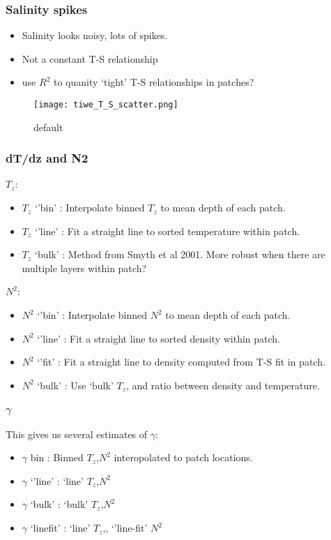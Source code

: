 \documentclass{beamer}
\begin{document}
\begin{frame}
 \frametitle{Salinity spikes}
\begin{itemize}
\item Salinity looks noisy, lots of spikes.
\item Not a constant T-S relationship 
\item use $R^2$ to quanity `tight' T-S relationships in patches?
\end{itemize}


\begin{figure}[htbp]
\begin{center}
\texttt{[image: tiwe\_T\_S\_scatter.png]}
\caption{default}
\label{default}
\end{center}
\end{figure}


\end{frame}




\begin{frame}
 \frametitle{dT/dz and N2}
 
$T_z$:
\begin{itemize}
\item $T_z$ `'bin' : Interpolate binned $T_z$ to mean depth of each patch.
\item $T_z$ `'line' : Fit a straight line to sorted temperature within patch.
\item $T_z$ `bulk' : Method from Smyth et al 2001. More robust when there are multiple layers within patch?
\end{itemize}

$N^2$:
\begin{itemize}
\item $N^2$ `'bin' : Interpolate binned $N^2$ to mean depth of each patch.
\item $N^2$ `'line' : Fit a straight line to sorted density within patch.
\item $N^2$ `'fit' : Fit a straight line to density computed from T-S fit in patch.
\item $N^2$ `bulk' : Use `bulk' $T_z$, and ratio between density and temperature.
\end{itemize}


\end{frame}




\begin{frame}
 \frametitle{$\gamma$}

This gives us several estimates of $\gamma$: 
\begin{itemize}
\item $\gamma$ bin : Binned $T_z$,$N^2$ interopolated to patch locations.
\item $\gamma$ `'line' : `line' $T_z$,$N^2$
\item $\gamma$ `bulk' : `bulk' $T_z$,$N^2$
\item $\gamma$ `linefit' : `line' $T_z$,, `'line-fit' $N^2$
\end{itemize}

\end{frame}
\end{document}

